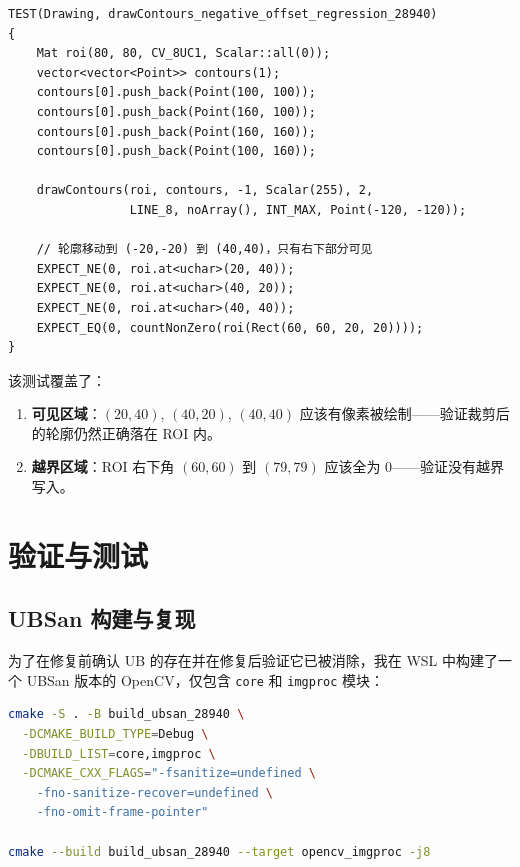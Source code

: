 \documentclass[12pt,a4paper]{article}
\begin{document}
\begin{lstlisting}
TEST(Drawing, drawContours_negative_offset_regression_28940)
{
    Mat roi(80, 80, CV_8UC1, Scalar::all(0));
    vector<vector<Point>> contours(1);
    contours[0].push_back(Point(100, 100));
    contours[0].push_back(Point(160, 100));
    contours[0].push_back(Point(160, 160));
    contours[0].push_back(Point(100, 160));

    drawContours(roi, contours, -1, Scalar(255), 2,
                 LINE_8, noArray(), INT_MAX, Point(-120, -120));

    // 轮廓移动到 (-20,-20) 到 (40,40)，只有右下部分可见
    EXPECT_NE(0, roi.at<uchar>(20, 40));
    EXPECT_NE(0, roi.at<uchar>(40, 20));
    EXPECT_NE(0, roi.at<uchar>(40, 40));
    EXPECT_EQ(0, countNonZero(roi(Rect(60, 60, 20, 20))));
}
\end{lstlisting}

该测试覆盖了：
\begin{enumerate}[leftmargin=*]
    \item \textbf{可见区域}：$(20, 40)$, $(40, 20)$, $(40, 40)$ 应该有像素被绘制——验证裁剪后的轮廓仍然正确落在 ROI 内。
    \item \textbf{越界区域}：ROI 右下角 $(60, 60)$ 到 $(79, 79)$ 应该全为 0——验证没有越界写入。
\end{enumerate}

\section{验证与测试}

\subsection{UBSan 构建与复现}

为了在修复前确认 UB 的存在并在修复后验证它已被消除，我在 WSL 中构建了一个 UBSan 版本的 OpenCV，仅包含 \texttt{core} 和 \texttt{imgproc} 模块：

\begin{lstlisting}[language=bash]
cmake -S . -B build_ubsan_28940 \
  -DCMAKE_BUILD_TYPE=Debug \
  -DBUILD_LIST=core,imgproc \
  -DCMAKE_CXX_FLAGS="-fsanitize=undefined \
    -fno-sanitize-recover=undefined \
    -fno-omit-frame-pointer"

cmake --build build_ubsan_28940 --target opencv_imgproc -j8
\end{lstlisting}
\end{document}
